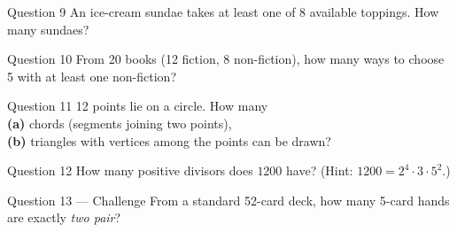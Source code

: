 \documentclass[11pt]{article}
\begin{document}
\begin{qbox}{Question 9}
An ice-cream sundae takes at least one of 8 available toppings. How many sundaes?\workspace{2.4cm}
\end{qbox}

\begin{qbox}{Question 10}
From 20 books (12 fiction, 8 non-fiction), how many ways to choose 5 with at least one non-fiction?\workspace{2.4cm}
\end{qbox}

\begin{qbox}{Question 11}
12 points lie on a circle. How many \\ \textbf{(a)} chords (segments joining two points), \\ \textbf{(b)} triangles with vertices among the points can be drawn?\workspace{2.4cm}
\end{qbox}

\begin{qbox}{Question 12}
How many positive divisors does $1200$ have? (Hint: $1200=2^4\cdot3\cdot5^2$.)\workspace{2.4cm}
\end{qbox}

\begin{qbox}{Question 13 --- Challenge}
From a standard 52-card deck, how many 5-card hands are exactly \emph{two pair}?\workspace{3.4cm}
\end{qbox}

\clearpage
{}
\end{document}
